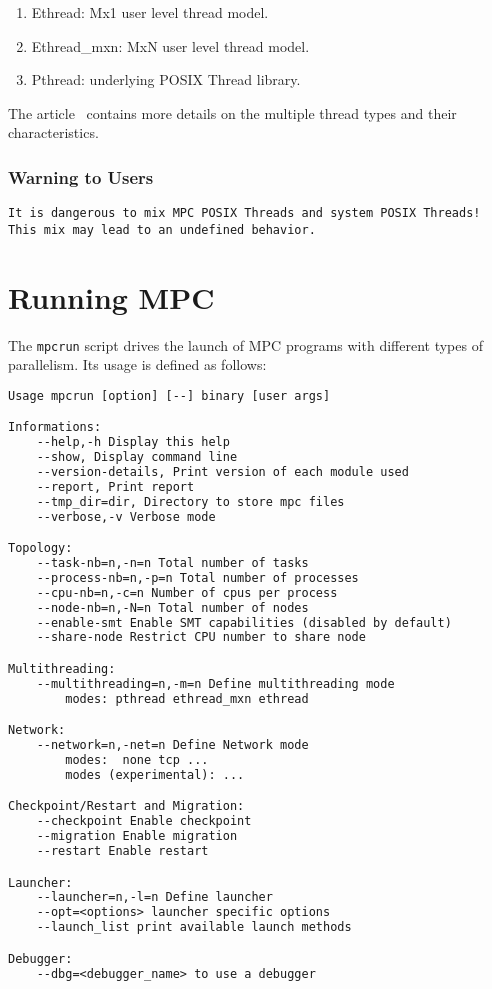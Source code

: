 \documentclass[a4paper,11pt]{article}
\begin{document}
\begin{enumerate}
  \item  Ethread: Mx1 user level thread model.

  \item   Ethread\_mxn: MxN user level thread model.

  \item   Pthread: underlying POSIX Thread library.

\end{enumerate}
The article~\cite{Perache08} contains more details on the multiple thread types and their characteristics.


\subsubsection{Warning to Users}

\begin{lstlisting}[basicstyle=\color{BrickRed}]
It is dangerous to mix MPC POSIX Threads and system POSIX Threads!
This mix may lead to an undefined behavior.
\end{lstlisting}
\section{Running MPC}

The \texttt{mpcrun} script drives the launch of MPC programs with different
types of parallelism.
Its usage is defined as follows:
\begin{lstlisting}[language=TeX]
Usage mpcrun [option] [--] binary [user args]

Informations:
    --help,-h Display this help
    --show, Display command line
    --version-details, Print version of each module used
    --report, Print report
    --tmp_dir=dir, Directory to store mpc files
    --verbose,-v Verbose mode

Topology:
    --task-nb=n,-n=n Total number of tasks
    --process-nb=n,-p=n Total number of processes
    --cpu-nb=n,-c=n Number of cpus per process
    --node-nb=n,-N=n Total number of nodes
    --enable-smt Enable SMT capabilities (disabled by default)
    --share-node Restrict CPU number to share node

Multithreading:
    --multithreading=n,-m=n Define multithreading mode
        modes: pthread ethread_mxn ethread

Network:
    --network=n,-net=n Define Network mode
        modes:  none tcp ...
        modes (experimental): ...

Checkpoint/Restart and Migration:
    --checkpoint Enable checkpoint
    --migration Enable migration
    --restart Enable restart

Launcher:
    --launcher=n,-l=n Define launcher
    --opt=<options> launcher specific options
    --launch_list print available launch methods

Debugger:
    --dbg=<debugger_name> to use a debugger

\end{lstlisting}
\end{document}

